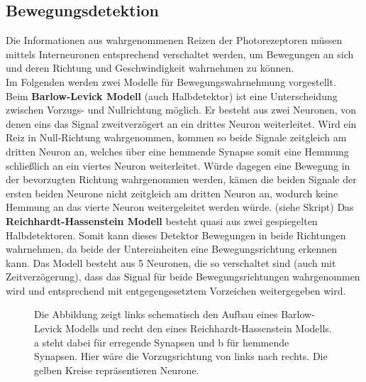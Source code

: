 \documentclass[11pt]{article}
\begin{document}
\subsection{Bewegungsdetektion}\label{bewegung}
Die Informationen aus wahrgenommenen Reizen der Photorezeptoren müssen mittels Interneuronen entsprechend verschaltet werden, um Bewegungen an sich und deren Richtung und Geschwindigkeit wahrnehmen zu können. \\
Im Folgenden werden zwei Modelle für Bewegungswahrnehmung vorgestellt. \\
Beim \textbf{Barlow-Levick Modell} (auch Halbdetektor) ist eine Unterscheidung zwischen Vorzugs- und Nullrichtung möglich. Er besteht aus zwei Neuronen, von denen eins das Signal zweitverzögert an ein drittes Neuron weiterleitet. Wird ein Reiz in Null-Richtung wahrgenommen, kommen so beide Signale zeitgleich am dritten Neuron an, welches über eine hemmende Synapse somit eine Hemmung schließlich an ein viertes  Neuron weiterleitet. Würde dagegen eine Bewegung in der bevorzugten Richtung wahrgenommen werden, kämen die beiden Signale der ersten beiden Neurone nicht zeitgleich am dritten Neuron an, wodurch keine Hemmung an das vierte Neuron weitergeleitet werden würde.  (siehe Skript)
Das \textbf{Reichhardt-Hassenstein Modell} besteht quasi aus zwei gespiegelten Halbdetektoren. Somit kann dieses Detektor Bewegungen in beide Richtungen wahrnehmen, da beide der Untereinheiten eine Bewegungsrichtung erkennen kann. Das Modell besteht aus 5 Neuronen, die so verschaltet sind (auch mit Zeitverzögerung), dass das Signal für beide Bewegungsrichtungen wahrgenommen wird und entsprechend mit entgegengesetztem Vorzeichen weitergegeben wird. \\
\begin{figure}[H]
\caption{Die Abbildung zeigt links schematisch den Aufbau eines Barlow-Levick Modells und recht den eines Reichhardt-Hassenstein Modells. a steht dabei für erregende Synapsen und b für hemmende Synapsen. Hier wäre die Vorzugsrichtung von links nach rechts. Die gelben Kreise repräsentieren Neurone.}
\label{modelle}
\end{figure}
\end{document}
